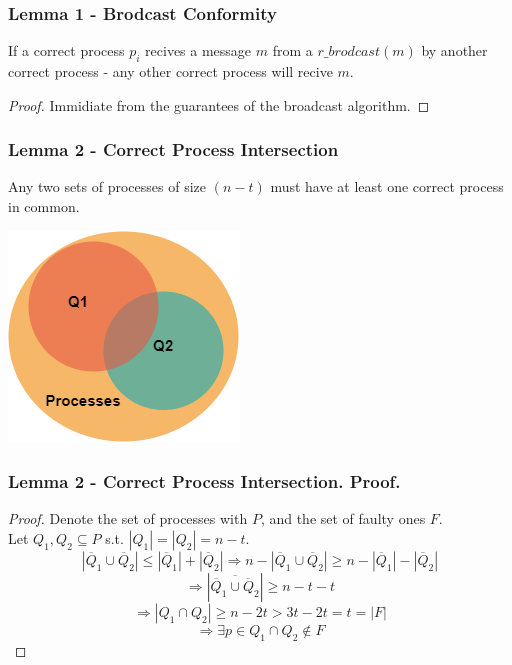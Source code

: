 \begin{frame}
    \frametitle{Lemma 1 - Brodcast Conformity}
    \begin{lemma}
        If a correct process $p_i$ recives a message $m$ from a $r\_brodcast(m)$ by another correct process - 
        any other correct process will recive $m$.\\
    \end{lemma}

    \begin{proof}
        Immidiate from the guarantees of the broadcast algorithm.
    \end{proof}
\end{frame}
\begin{frame}
    \frametitle{Lemma 2 - Correct Process Intersection}
    \begin{lemma}
        Any two sets of processes of size $(n-t)$ must have
        at least one correct process in common.
    \end{lemma}
    \begin{center}
        \includegraphics[scale=.5]{resources/lemma2_venn.png}
    \end{center}
\end{frame}
\begin{frame}
    \frametitle{Lemma 2 - Correct Process Intersection. Proof.}
    \begin{proof}
        Denote the set of processes with $P$, and the set of faulty ones $F$.\\
        Let $Q_1,Q_2\subseteq P$ s.t. $|Q_1|=|Q_2|=n-t$.\\
        \[
            |\overline{Q}_1\cup\overline{Q}_2|\leq |\overline{Q}_1|+|\overline{Q}_2|
            \Rightarrow n-|\overline{Q}_1\cup\overline{Q}_2|\geq n-|\overline{Q}_1|-|\overline{Q}_2|
        \]\[
            \Rightarrow |\overline{\overline{Q}_1\cup\overline{Q}_2}|\geq n-t-t
        \]\[
            \Rightarrow |Q_1\cap Q_2|\geq n-2t>3t-2t=t=|F|
        \]\[
            \Rightarrow \exists p\in Q_1\cap Q_2\notin F
        \]
    \end{proof}
\end{frame}

